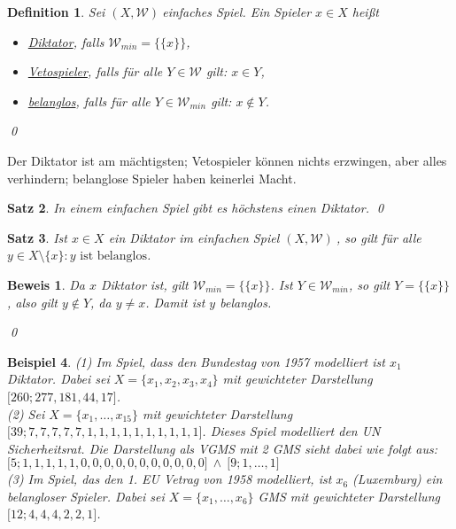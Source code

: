 \documentclass[ngerman]{scrartcl}
\theoremstyle{custom}
\newtheorem{mdef}{Definition} \numberwithin{mdef}{subsection}
\newtheorem{mex}[mdef]{Beispiel}
\newtheorem{ms}[mdef]{Satz}
\newtheorem*{bw}{Beweis}
\newcommand{\0}{\mathbf{0}}
\newcommand{\1}{\mathbf{L}}
\newcommand{\sg}{$(X,\mathcal{W})~$}
\begin{document}
\begin{mdef}
Sei \sg einfaches Spiel. Ein Spieler $x \in X$ hei\ss t
\begin{itemize}
\item[(1)] \underline{Diktator}, falls $\mathcal{W}_{min} =
\{\{x\}\}$,
\item[(2)] \underline{Vetospieler}, falls f\"ur alle $Y \in
  \mathcal{W}$ gilt: $x \in Y$,
\item[(3)] \underline{belanglos}, falls f\"ur alle $Y \in
  \mathcal{W}_{min}$ gilt: $x \not \in Y$.
\end{itemize}
\qed
\end{mdef}

Der Diktator ist am m\"achtigsten; Vetospieler k\"onnen nichts
erzwingen, aber alles verhindern; belanglose Spieler haben keinerlei
Macht.

\begin{ms}
In einem einfachen Spiel gibt es h\"ochstens einen Diktator.
\qed
\end{ms}

\begin{ms}
Ist $x \in X$ ein Diktator im einfachen Spiel \sg, so gilt f\"ur alle
$y \in X \setminus \{x\}: y \text{ ist belanglos}$.
\end{ms}

\begin{bw}
Da $x$ Diktator ist, gilt $\mathcal{W}_{min} = \{\{x\}\}$. Ist $Y \in
\mathcal{W}_{min}$, so gilt $Y = \{\{x\}\}$, also gilt $y
\not \in Y$, da $y \not = x$. Damit ist $y$ belanglos.

\qed
\end{bw}

\begin{mex}
(1) Im Spiel, dass den Bundestag von 1957 modelliert ist $x_1$
Diktator. Dabei sei $X =\{x_1,x_2,x_3,x_4\}$ mit gewichteter
Darstellung $\lbrack 260; 277,181, 44, 17 \rbrack$.\\

(2) Sei $X = \{x_1, \dots, x_15\}$ mit gewichteter Darstellung
$\lbrack 39; 7, 7, 7, 7, 7, 1 ,1 ,1 ,1 ,1, 1, 1, 1, 1, 1
\rbrack$. Dieses Spiel modelliert den UN Sicherheitsrat. Die
Darstellung als VGMS mit 2 GMS sieht dabei wie folgt aus:
$\lbrack 5; 1, 1, 1, 1, 1, 0, 0, 0, 0, 0, 0, 0, 0, 0, 0, 0 \rbrack
~\wedge~ \lbrack 9; 1, \dots, 1\rbrack$\\

(3) Im Spiel, das den 1. EU Vetrag von 1958 modelliert, ist $x_6$
(Luxemburg) ein belangloser Spieler. Dabei sei $X = \{x_1,\dots,x_6\}$
GMS mit gewichteter Darstellung $\lbrack 12; 4, 4, 4, 2, 2, 1\rbrack$.
\end{mex}
\end{document}
